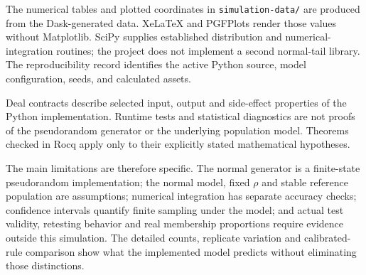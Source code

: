 The numerical tables and plotted coordinates in
\texttt{simulation-data/} are produced from the Dask-generated data.
XeLaTeX and PGFPlots render those values without Matplotlib. SciPy
supplies established distribution and numerical-integration routines;
the project does not implement a second normal-tail library.
The reproducibility record identifies the active Python source, model
configuration, seeds, and calculated assets.

Deal contracts describe selected input, output and side-effect
properties of the Python implementation. Runtime tests and statistical
diagnostics are not proofs of the pseudorandom generator or the
underlying population model. Theorems checked in Rocq apply only to
their explicitly stated mathematical hypotheses.

The main limitations are therefore specific. The normal generator is a
finite-state pseudorandom implementation; the normal model, fixed \(\rho\)
and stable reference population are assumptions; numerical integration has
separate accuracy checks; confidence intervals quantify finite sampling under
the model; and actual test validity, retesting behavior and real membership
proportions require evidence outside this simulation. The detailed counts,
replicate variation and calibrated-rule comparison show what the implemented
model predicts without eliminating those distinctions.

\appendix







\ProjectReportAIAppendix

